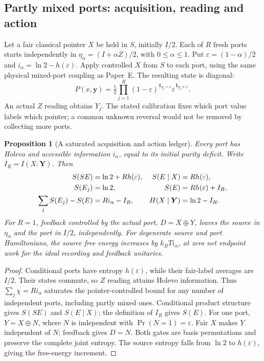 \documentclass[12pt,a4paper]{article}
\newtheorem{proposition}[theorem]{Proposition}
\begin{document}
\subsection{Partly mixed ports: acquisition, reading and action}
\label{subsec:mixed}

Let a fair classical pointer \(X\) be held in \(S\), initially \(I/2\).
Each of \(R\) fresh ports starts independently in
\(\eta_\alpha=(I+\alpha Z)/2\), with \(0\le\alpha\le1\).
Put \(\varepsilon=(1-\alpha)/2\) and
\(i_\alpha=\ln2-h(\varepsilon)\). Apply controlled \(X\) from
\(S\) to each port, using the same physical mixed-port coupling as
Paper~E. The resulting state is diagonal:
\begin{equation}\label{eq:mixed-joint}
 P(x,\boldsymbol y)=\tfrac12\prod_{j=1}^R
 (1-\varepsilon)^{\mathbf1_{y_j=x}}
 \varepsilon^{\mathbf1_{y_j\ne x}} .
\end{equation}
An actual \(Z\) reading obtains \(Y_j\). The stated calibration fixes which
port value labels which pointer; a common unknown reversal would not be
removed by collecting more ports.

\begin{proposition}[A saturated acquisition and action ledger]
\label{prop:mixed-ledger}
Every port has Holevo and accessible information \(i_\alpha\), equal to
its initial purity deficit. Write \(I_R=I(X:\boldsymbol Y)\).
Then
\begin{align}
 S(SE)&=\ln2+Rh(\varepsilon),&
 S(E\mid X)&=Rh(\varepsilon),\notag\\
 S(E_j)&=\ln2,&
 S(E)&=Rh(\varepsilon)+I_R,\label{eq:mixed-ledger}\\
 \sum_jS(E_j)-S(E)&=Ri_\alpha-I_R,&
 H(X\mid\boldsymbol Y)&=\ln2-I_R.\notag
\end{align}
For \(R=1\), feedback controlled by the actual port,
\(D=X\oplus Y\), leaves the source in \(\eta_\alpha\) and the port
in \(I/2\), independently. For degenerate source and port Hamiltonians,
the source free energy increases by \(k_BT i_\alpha\), at zero net
endpoint work for the ideal recording and feedback unitaries.
\end{proposition}
\begin{proof}
Conditional ports have entropy \(h(\varepsilon)\), while their fair-label
averages are \(I/2\). Their states commute, so \(Z\) reading attains
Holevo information. Thus \(\sum_j\chi=Ri_\alpha\) saturates the
pointer-controlled bound for any number of independent ports, including
partly mixed ones. Conditional product structure gives \(S(SE)\) and
\(S(E\mid X)\); the definition of \(I_R\) gives \(S(E)\).
For one port, \(Y=X\oplus N\), where \(N\) is independent with
\(\Pr(N=1)=\varepsilon\). Fair \(X\) makes \(Y\) independent of \(N\);
feedback gives \(D=N\). Both gates are basis permutations and preserve
the complete joint entropy. The source entropy falls from \(\ln2\) to
\(h(\varepsilon)\), giving the free-energy increment.
\end{proof}
\end{document}
